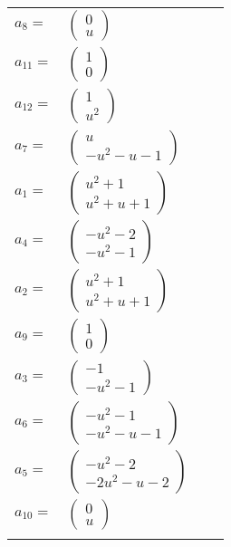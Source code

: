 \documentclass[1p]{elsarticle_modified}
\theoremstyle{definition}
\begin{document}
\begin{tabular}{m{7pt} m{180pt} m{7pt} m{180pt} }
\flushright $a_{8}=$&$\begin{pmatrix}0\\u\end{pmatrix}$ \\
\flushright $a_{11}=$&$\begin{pmatrix}1\\0\end{pmatrix}$ \\
\flushright $a_{12}=$&$\begin{pmatrix}1\\u^2\end{pmatrix}$ \\
\flushright $a_{7}=$&$\begin{pmatrix}u\\- u^2- u-1\end{pmatrix}$ \\
\flushright $a_{1}=$&$\begin{pmatrix}u^2+1\\u^2+u+1\end{pmatrix}$ \\
\flushright $a_{4}=$&$\begin{pmatrix}- u^2-2\\- u^2-1\end{pmatrix}$ \\
\flushright $a_{2}=$&$\begin{pmatrix}u^2+1\\u^2+u+1\end{pmatrix}$ \\
\flushright $a_{9}=$&$\begin{pmatrix}1\\0\end{pmatrix}$ \\
\flushright $a_{3}=$&$\begin{pmatrix}-1\\- u^2-1\end{pmatrix}$ \\
\flushright $a_{6}=$&$\begin{pmatrix}- u^2-1\\- u^2- u-1\end{pmatrix}$ \\
\flushright $a_{5}=$&$\begin{pmatrix}- u^2-2\\-2 u^2- u-2\end{pmatrix}$ \\
\flushright $a_{10}=$&$\begin{pmatrix}0\\u\end{pmatrix}$\\&\end{tabular}
\end{document}
